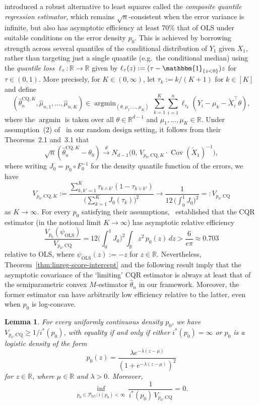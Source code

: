 \documentclass[a4paper]{article}
\newcommand{\R}{\mathbb{R}}
\newcommand{\Ind}{\mathbbm{1}}
\newcommand{\cvd}{\overset{d}{\to}}
\DeclareMathOperator\Cov{Cov}
\DeclareMathOperator*{\argmin}{argmin}
\newtheorem{lemma}[theorem]{Lemma}
\theoremstyle{definition}
\begin{document}
\citet{zou2008composite} introduced a robust alternative to least squares called the \textit{composite quantile regression estimator}, which remains $\sqrt{n}$-consistent when the error variance is infinite, but also has asymptotic efficiency at least 70\% that of OLS under suitable conditions on the error density $p_0$. This is achieved by borrowing strength across several quantiles of the conditional distribution of $Y_1$ given $X_1$, rather than targeting just a single quantile (e.g.~the conditional median) using the \textit{quantile loss} $\ell_\tau \colon \R \to \R$ given by $\ell_\tau(z) := (\tau - \Ind_{\{z < 0\}})z$ for $\tau \in (0,1)$. More precisely, for $K \in (0,\infty)$, let $\tau_k := k/(K + 1)$ for $k \in [K]$ and define
\begin{equation}
\label{eq:CQR}
(\hat{\theta}_n^{\mathrm{CQ},K},\hat{\mu}_{n,1},\dotsc,\hat{\mu}_{n,K}) \in \argmin_{(\theta,\mu_1,\dotsc,\mu_K)}\,\sum_{k=1}^K \sum_{i=1}^n \ell_{\tau_k}(Y_i - \mu_k - \tilde{X}_i^\top\theta),
\end{equation}
where the $\argmin$ is taken over all $\theta \in \R^{d-1}$ and $\mu_1,\dotsc,\mu_K \in \R$. Under assumption~(2) of~\citet{zou2008composite} in our random design setting, it follows from their Theorems~2.1 and~3.1 that
\[
\sqrt{n}(\hat{\theta}_n^{\mathrm{CQ},K} - \theta_0) \cvd N_{d-1}\bigl(0,\,V_{p_0,\mathrm{CQ},K} \cdot \Cov(\tilde{X}_1)^{-1}\bigr),
\]
where writing $J_0 = p_0 \circ F_0^{-1}$ for the density quantile function of the errors, we have
\[
V_{p_0,\mathrm{CQ},K} := \frac{\sum_{k,k'=1}^K \tau_{k \wedge k'}(1 - \tau_{k \vee k'})}{\bigl(\sum_{k=1}^K J_0(\tau_k)\bigr)^2} \to \frac{1}{12\,\bigl(\int_0^1 J_0\bigr)^2} =: V_{p_0,\mathrm{CQ}}
\]
as $K \to \infty$. For every $p_0$ satisfying their assumptions,~\citet[Theorem~3.1]{zou2008composite} established that the CQR estimator (in the notional limit $K \to \infty$) has asymptotic relative efficiency
\[
\frac{V_{p_0}(\psi_{\mathrm{OLS}})}{V_{p_0,\mathrm{CQ}}} = 12\biggl(\int_0^1 J_0\biggr)^2 \int_\R z^2\,p_0(z)\,dz > \frac{6}{e\pi} \approx 0.703
\]
relative to OLS, where $\psi_{\mathrm{OLS}}(z) := -z$ for $z \in \R$. Nevertheless, Theorem~\ref{thm:linreg-score-intercept} and the following result imply that the asymptotic covariance of the `limiting' CQR estimator is always at least that of the semiparametric convex $M$-estimator $\hat{\theta}_n$ in our framework. Moreover, the former estimator can have arbitrarily low efficiency relative to the latter, even when $p_0$ is log-concave.

\begin{lemma}
\label{lem:CQR-suboptimal}
For every uniformly continuous density $p_0$, we have $V_{p_0,\mathrm{CQ}} \geq 1/i^*(p_0)$, with equality if and only if either $i^*(p_0) = \infty$ or $p_0$ is a logistic density of the form
\[
p_0(z) = \frac{\lambda e^{-\lambda(z - \mu)}}{(1 + e^{-\lambda(z - \mu)})^2}
\]
for $z \in \R$, where $\mu \in \R$ and $\lambda > 0$. 
Moreover,
\[
\inf_{p_0 \in \mathcal{P}_{\mathrm{LC}} : i(p_0) < \infty}\,\frac{1}{i^*(p_0) \, V_{p_0,\mathrm{CQ}}} = 0.
\]
\end{lemma}
\end{document}
